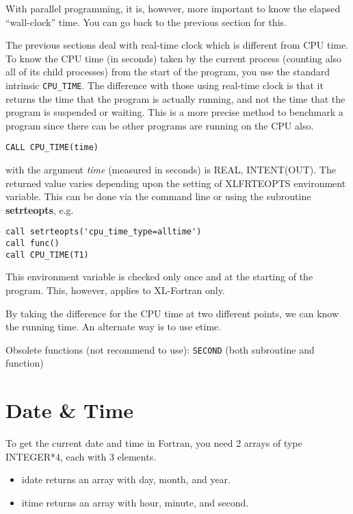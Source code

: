 With parallel programming, it is, however, more important to know the
elapsed ``wall-clock'' time. You can go back to the previous section
for this.



The previous sections deal with real-time clock which is different
from CPU time.  To know the CPU time (in seconds) taken by the current
process (counting also all of its child processes) from the start of
the program, you use the standard intrinsic \verb!CPU_TIME!. The
difference with those using real-time clock is that it returns the
time that the program is actually running, and not the time that the
program is suspended or waiting. This is a more precise method to
benchmark a program since there can be other programs are running on
the CPU also.

\begin{lstlisting}
CALL CPU_TIME(time)
\end{lstlisting}
with the argument {\it time} (measured in seconds) is REAL,
INTENT(OUT). The returned value varies depending upon the setting of
XLFRTEOPTS environment variable. This can be done via the command line
or using the subroutine {\bf setrteopts}, e.g.
\begin{lstlisting}
call setrteopts('cpu_time_type=alltime')
call func()
call CPU_TIME(T1)
\end{lstlisting}
This environment variable is checked only once and at the starting of
the program. This, however, applies to XL-Fortran only.

By taking the difference for the CPU time at two different points, we
can know the running time. An alternate way is to use etime.

Obsolete functions (not recommend to use): \verb!SECOND! (both
subroutine and function)


\section{Date \& Time}
\label{sec:date--time}


To get the current date and time in Fortran, you need 2 arrays of type
INTEGER*4, each with 3 elements.
\begin{itemize}
\item idate returns an array with day, month, and year.
\item itime returns an array with hour, minute, and second.
\end{itemize}

